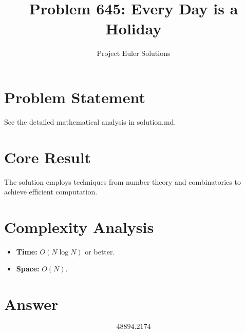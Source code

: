 \documentclass[11pt]{article}
\title{Problem 645: Every Day is a Holiday}
\author{Project Euler Solutions}
\date{}
\begin{document}
\maketitle

\section{Problem Statement}

See the detailed mathematical analysis in solution.md.

\section{Core Result}

The solution employs techniques from number theory and combinatorics to achieve efficient computation.

\section{Complexity Analysis}

\begin{itemize}
\item \textbf{Time:} $O(N \log N)$ or better.
\item \textbf{Space:} $O(N)$.
\end{itemize}

\section{Answer}

\[
\boxed{48894.2174}
\]
\end{document}
